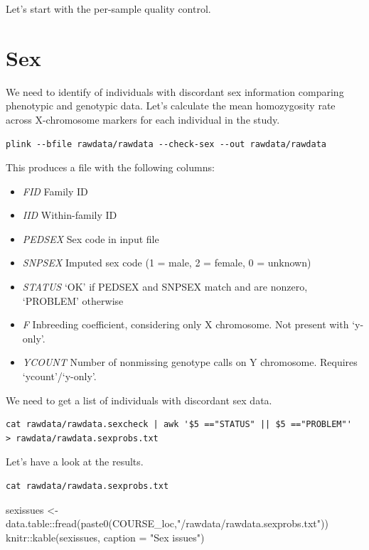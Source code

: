 \documentclass[
]{book}
\newenvironment{Shaded}{\begin{snugshade}}{\end{snugshade}}
\newcommand{\AttributeTok}[1]{\textcolor[rgb]{0.77,0.63,0.00}{#1}}
\newcommand{\FunctionTok}[1]{\textcolor[rgb]{0.00,0.00,0.00}{#1}}
\newcommand{\NormalTok}[1]{#1}
\newcommand{\OtherTok}[1]{\textcolor[rgb]{0.56,0.35,0.01}{#1}}
\newcommand{\SpecialCharTok}[1]{\textcolor[rgb]{0.00,0.00,0.00}{#1}}
\newcommand{\StringTok}[1]{\textcolor[rgb]{0.31,0.60,0.02}{#1}}
\providecommand{\tightlist}{%
  \setlength{\itemsep}{0pt}\setlength{\parskip}{0pt}}
\begin{document}
Let's start with the per-sample quality control.

\hypertarget{sex}{%
\section{Sex}\label{sex}}

We need to identify of individuals with discordant sex information comparing phenotypic and genotypic data. Let's calculate the mean homozygosity rate across X-chromosome markers for each individual in the study.

\begin{verbatim}
plink --bfile rawdata/rawdata --check-sex --out rawdata/rawdata
\end{verbatim}

This produces a file with the following columns:

\begin{itemize}
\tightlist
\item
  \emph{FID} Family ID
\item
  \emph{IID} Within-family ID
\item
  \emph{PEDSEX} Sex code in input file
\item
  \emph{SNPSEX} Imputed sex code (1 = male, 2 = female, 0 = unknown)
\item
  \emph{STATUS} `OK' if PEDSEX and SNPSEX match and are nonzero, `PROBLEM' otherwise
\item
  \emph{F} Inbreeding coefficient, considering only X chromosome. Not present with `y-only'.
\item
  \emph{YCOUNT} Number of nonmissing genotype calls on Y chromosome. Requires `ycount'/`y-only'.
\end{itemize}

We need to get a list of individuals with discordant sex data.

\begin{verbatim}
cat rawdata/rawdata.sexcheck | awk '$5 =="STATUS" || $5 =="PROBLEM"'  > rawdata/rawdata.sexprobs.txt
\end{verbatim}

Let's have a look at the results.

\begin{verbatim}
cat rawdata/rawdata.sexprobs.txt
\end{verbatim}

\begin{Shaded}
\begin{Highlighting}[]
\NormalTok{sexissues }\OtherTok{\textless{}{-}}\NormalTok{ data.table}\SpecialCharTok{::}\FunctionTok{fread}\NormalTok{(}\FunctionTok{paste0}\NormalTok{(COURSE\_loc,}\StringTok{"/rawdata/rawdata.sexprobs.txt"}\NormalTok{))}
\NormalTok{knitr}\SpecialCharTok{::}\FunctionTok{kable}\NormalTok{(sexissues, }\AttributeTok{caption =} \StringTok{"Sex issues"}\NormalTok{)}
\end{Highlighting}
\end{Shaded}
\end{document}
